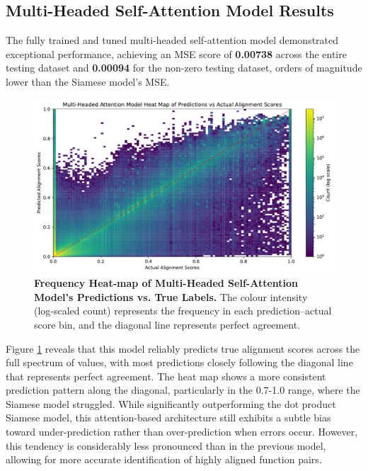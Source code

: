 \subsection{Multi-Headed Self-Attention Model Results}
The fully trained and tuned multi-headed self-attention model demonstrated exceptional performance, achieving an MSE score of \textbf{0.00738} across the entire testing dataset and \textbf{0.00094} for the non-zero testing dataset, orders of magnitude lower than the Siamese model's MSE.


\begin{figure}[tbh!]
\centering
\includegraphics[scale=0.65]{Figures/Multi-Headed_Attention_Model_Heatmap.pdf}
\caption{\textbf{Frequency Heat‑map of Multi-Headed Self-Attention Model's Predictions vs. True Labels.} The colour intensity (log‑scaled count) represents the frequency in each prediction–actual score bin, and the diagonal line represents perfect agreement.} 
\label{fig:AttentionModelHeatmap}
\end{figure}

Figure \ref{fig:AttentionModelHeatmap} reveals that this model reliably predicts true alignment scores across the full spectrum of values, with most predictions closely following the diagonal line that represents perfect agreement. The heat map shows a more consistent prediction pattern along the diagonal, particularly in the 0.7-1.0 range, where the Siamese model struggled. While significantly outperforming the dot product Siamese model, this attention-based architecture still exhibits a subtle bias toward under-prediction rather than over-prediction when errors occur. However, this tendency is considerably less pronounced than in the previous model, allowing for more accurate identification of highly aligned function pairs.

